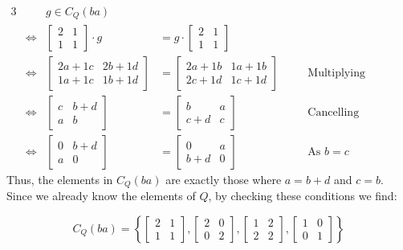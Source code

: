 \documentclass[a4paper, 11pt]{article}
\def\set#1{\left\{ #1 \right\}}
\begin{document}
\begin{enumerate}[label=(\alph*)]
	\begin{alignat*}{3}
		&& g\in C_Q(ba) \\
		&\iff&\begin{bmatrix}
			2 & 1 \\
			1 & 1 
		\end{bmatrix}\cdot g 
		&= g\cdot\begin{bmatrix}
			2 & 1 \\
			1 & 1 
		\end{bmatrix}\\
		&\iff & 
		\begin{bmatrix}
			2a + 1c & 2b + 1d \\
			1a + 1c & 1b + 1d 
		\end{bmatrix} &= 
		\begin{bmatrix}
			2a + 1b & 1a+1b \\ 
			2c + 1d & 1c+1d 
		\end{bmatrix} & \quad & \text{Multiplying Matrices}\\
		&\iff & 
		\begin{bmatrix}
			c & b + d \\
			a & b 
		\end{bmatrix} &= 
		\begin{bmatrix}
			b & a \\ 
			c + d & c
		\end{bmatrix} &\quad & \text{Cancelling}\\
		&\iff & 
		\begin{bmatrix}
			0 & b + d \\
			a & 0 
		\end{bmatrix} &= 
		\begin{bmatrix}
			0 & a \\ 
			b + d & 0
		\end{bmatrix} & \quad & \text{As $b=c$}
	\end{alignat*}
	Thus, the elements in $C_Q(ba)$ are exactly those where $a=b+d$ and $c=b$. Since we already know the elements of $Q$, by checking these conditions we find: 

	\[
		C_Q(ba) = \set{
			\begin{bmatrix}
				2 & 1 \\
				1 & 1
			\end{bmatrix},			
			\begin{bmatrix}
				2 & 0 \\
				0 & 2
			\end{bmatrix},
			\begin{bmatrix}
				1 & 2 \\
				2 & 2
			\end{bmatrix},
			\begin{bmatrix}
				1 & 0 \\
				0 & 1
			\end{bmatrix}
		}
	\]

\end{enumerate}
\end{document}
